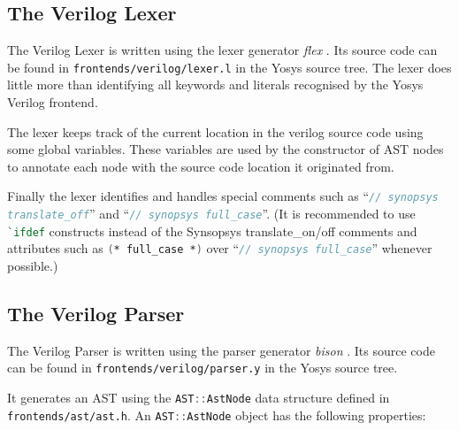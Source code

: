 \subsection{The Verilog Lexer}

\begin{sloppypar}
The Verilog Lexer is written using the lexer generator {\it flex} . Its source code
can be found in {\tt frontends/verilog/lexer.l} in the Yosys source tree.
The lexer does little more than identifying all keywords and literals
recognised by the Yosys Verilog frontend.
\end{sloppypar}

The lexer keeps track of the current location in the verilog source code using
some global variables. These variables are used by the constructor of AST nodes
to annotate each node with the source code location it originated from.

\begin{sloppypar}
Finally the lexer identifies and handles special comments such as
``\lstinline[language=Verilog]{// synopsys translate_off}'' and
``\lstinline[language=Verilog]{// synopsys full_case}''. (It is recommended to
use \lstinline[language=Verilog]{`ifdef} constructs instead of the Synsopsys
translate\_on/off comments and attributes such as
\lstinline[language=Verilog]{(* full_case *)} over ``\lstinline[language=Verilog]{// synopsys full_case}''
whenever possible.)
\end{sloppypar}

\subsection{The Verilog Parser}

The Verilog Parser is written using the parser generator {\it bison} . Its source code
can be found in {\tt frontends/verilog/parser.y} in the Yosys source tree.

It generates an AST using the \lstinline[language=C++]{AST::AstNode} data structure
defined in {\tt frontends/ast/ast.h}. An \lstinline[language=C++]{AST::AstNode} object has
the following properties:


